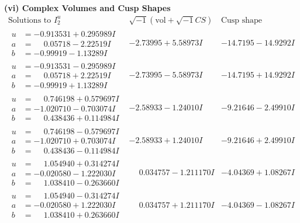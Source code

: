 \documentclass[1p]{elsarticle_modified}
\theoremstyle{definition}
\newcommand{\I}{\sqrt{-1}}
\begin{document}
\newpage\flushleft \textbf{(vi) Complex Volumes and Cusp Shapes}
$$\begin{array}{c|c|c}  
\text{Solutions to }I^u_{2}& \I (\text{vol} + \sqrt{-1}CS) & \text{Cusp shape}\\
 \hline 
\begin{aligned}
u &= -0.913531 + 0.295989 I \\
a &= \phantom{-}0.05718 - 2.22519 I \\
b &= -0.99919 - 1.13289 I\end{aligned}
 & -2.73995 + 5.58973 I & -14.7195 - 14.9292 I \\ \hline\begin{aligned}
u &= -0.913531 - 0.295989 I \\
a &= \phantom{-}0.05718 + 2.22519 I \\
b &= -0.99919 + 1.13289 I\end{aligned}
 & -2.73995 - 5.58973 I & -14.7195 + 14.9292 I \\ \hline\begin{aligned}
u &= \phantom{-}0.746198 + 0.579697 I \\
a &= -1.020710 - 0.703074 I \\
b &= \phantom{-}0.438436 + 0.114984 I\end{aligned}
 & -2.58933 - 1.24010 I & -9.21646 - 2.49910 I \\ \hline\begin{aligned}
u &= \phantom{-}0.746198 - 0.579697 I \\
a &= -1.020710 + 0.703074 I \\
b &= \phantom{-}0.438436 - 0.114984 I\end{aligned}
 & -2.58933 + 1.24010 I & -9.21646 + 2.49910 I \\ \hline\begin{aligned}
u &= \phantom{-}1.054940 + 0.314274 I \\
a &= -0.020580 - 1.222030 I \\
b &= \phantom{-}1.038410 - 0.263660 I\end{aligned}
 & \phantom{-}0.034757 - 1.211170 I & -4.04369 + 1.08267 I \\ \hline\begin{aligned}
u &= \phantom{-}1.054940 - 0.314274 I \\
a &= -0.020580 + 1.222030 I \\
b &= \phantom{-}1.038410 + 0.263660 I\end{aligned}
 & \phantom{-}0.034757 + 1.211170 I & -4.04369 - 1.08267 I \\ \hline\begin{aligned}

\end{aligned}
\end{array}$$
\end{document}
